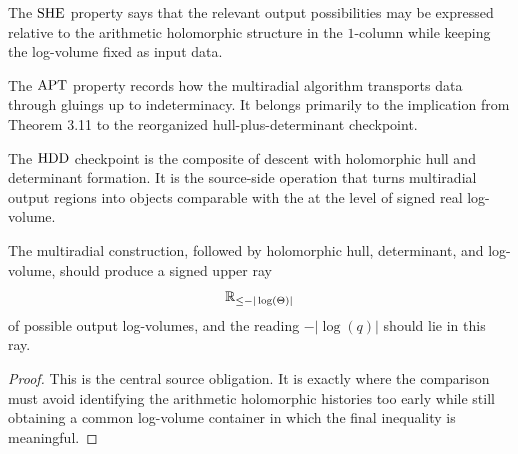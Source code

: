 \begin{definition}
  \label{def:she}
  \notready
  The \(\mathrm{SHE}\) property says that the relevant output possibilities may be
  expressed relative to the arithmetic holomorphic structure in the \(1\)-column
  while keeping the \qPilot{} log-volume fixed as input data.
\end{definition}

\begin{definition}
  \label{def:apt}
  \notready
  The \(\mathrm{APT}\) property records how the multiradial algorithm transports data
  through gluings up to indeterminacy.  It belongs primarily to the implication
  from Theorem 3.11 to the reorganized hull-plus-determinant checkpoint.
\end{definition}

\begin{definition}
  \label{def:hdd}
  \notready
  The \(\mathrm{HDD}\) checkpoint is the composite of descent with holomorphic hull
  and determinant formation.  It is the source-side operation that turns
  multiradial output regions into objects comparable with the \qPilot{} at
  the level of signed real log-volume.
\end{definition}

\begin{proposition}
  \label{prop:step-xi-upper-ray-input}
  \notready
  The multiradial construction, followed by holomorphic hull, determinant, and
  log-volume, should produce a signed upper ray
  \[
    \mathbb{R}_{\le -|\log(\Theta)|}
  \]
  of possible output log-volumes, and the \qPilot{} reading
  \(-|\log(q)|\) should lie in this ray.
\end{proposition}

\begin{proof}
  This is the central source obligation.  It is exactly where the comparison
  must avoid identifying the arithmetic holomorphic histories too early while
  still obtaining a common log-volume container in which the final inequality
  is meaningful.
\end{proof}

